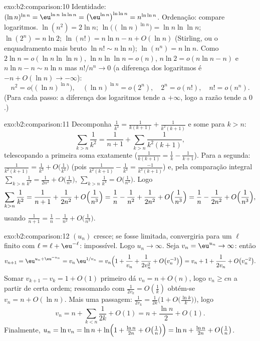 \begin{solution}{exo:b2:comparison:10}
Identidade: $(\ln n)^{\ln n} = \eu^{\ln n\,\ln\ln n} =
\bigl(\eu^{\ln n}\bigr)^{\ln\ln n} = n^{\ln\ln n}$. Ordenação:
compare logaritmos. $\ln(n^2) = 2\ln n$; $\ln\bigl((\ln
n)^{\ln n}\bigr) = \ln n\ln\ln n$; $\ln(2^n) = n\ln2$;
$\ln(n!) = n\ln n - n + O(\ln n)$ (Stirling, ou o enquadramento
mais bruto $\ln n! \sim n\ln n$); $\ln(n^n) = n\ln n$. Como
$2\ln n = o(\ln n\ln\ln n)$, $\ln n\ln\ln n = o(n)$, $n\ln 2 =
o(n\ln n - n)$ e $n \ln n - n \sim n\ln n$ mas $n! / n^n \to
0$ (a diferença dos logaritmos é $-n + O(\ln n) \to -\infty$):
\[
n^2 = o\bigl((\ln n)^{\ln n}\bigr),\quad
(\ln n)^{\ln n} = o(2^n),\quad
2^n = o(n!),\quad
n! = o(n^n).
\]
(Para cada passo: a diferença dos logaritmos tende a
$+\infty$, logo a razão tende a $0$.)
\end{solution}

\begin{solution}{exo:b2:comparison:11}
Decomponha $\frac1{k^2} = \frac1{k(k+1)} + \frac1{k^2(k+1)}$ e
some para $k > n$:
\[
\sum_{k>n}\frac1{k^2} = \frac1{n+1} +
\sum_{k>n}\frac{1}{k^2(k+1)} ,
\]
telescopando a primeira soma exatamente ($\frac1{k(k+1)} = \frac1k -
\frac1{k+1}$). Para a segunda: $\frac{1}{k^2(k+1)} = \frac1{k^3}
+ O\bigl(\frac1{k^4}\bigr)$ (pois $\frac{1}{k^2(k+1)} -
\frac1{k^3} = \frac{-1}{k^3(k+1)}$) e, pela
comparação integral $\sum_{k>n}\frac1{k^3} = \frac1{2n^2} +
O\bigl(\frac1{n^3}\bigr)$, $\sum_{k>n}\frac1{k^4} =
O\bigl(\frac1{n^3}\bigr)$. Logo
\[
\sum_{k>n}\frac1{k^2}
= \frac1{n+1} + \frac{1}{2n^2} + O\Bigl(\frac1{n^3}\Bigr)
= \frac1n - \frac1{n^2} + \frac{1}{2n^2} +
O\Bigl(\frac1{n^3}\Bigr)
= \frac1n - \frac{1}{2n^2} + O\Bigl(\frac1{n^3}\Bigr),
\]
usando $\frac1{n+1} = \frac1n - \frac1{n^2} +
O\bigl(\frac1{n^3}\bigr)$.
\end{solution}

\begin{solution}{exo:b2:comparison:12}
$(u_n)$ cresce; se fosse limitada, convergiria para um
$\ell$ finito com $\ell = \ell + \eu^{-\ell}$: impossível. Logo
$u_n \to \infty$. Seja $v_n = \eu^{u_n} \to \infty$: então
\[
v_{n+1} = \eu^{u_n + \eu^{-u_n}} = v_n\,\eu^{1/v_n}
= v_n\Bigl(1 + \frac1{v_n} + \frac1{2v_n^2} +
O\bigl(v_n^{-3}\bigr)\Bigr)
= v_n + 1 + \frac{1}{2v_n} + O\bigl(v_n^{-2}\bigr).
\]
Somar $v_{k+1} - v_k = 1 + O(1)$ primeiro dá $v_n = n +
O(n)$, logo $v_n \geq cn$ a partir de certa ordem; ressomando com
$\frac1{2v_k} = O(\frac1k)$ obtém-se $v_n = n + O(\ln n)$. Mais uma
passagem: $\frac{1}{2v_k} = \frac{1}{2k}\bigl(1 +
O\bigl(\tfrac{\ln k}k\bigr)\bigr)$, logo
\[
v_n = n + \sum_{k<n}\frac1{2k} + O(1) = n + \frac{\ln n}2 +
O(1).
\]
Finalmente, $u_n = \ln v_n = \ln n + \ln\Bigl(1 + \frac{\ln n}{2n} +
O\bigl(\tfrac1n\bigr)\Bigr) = \ln n + \frac{\ln n}{2n} +
O\bigl(\tfrac1n\bigr)$.
\end{solution}

